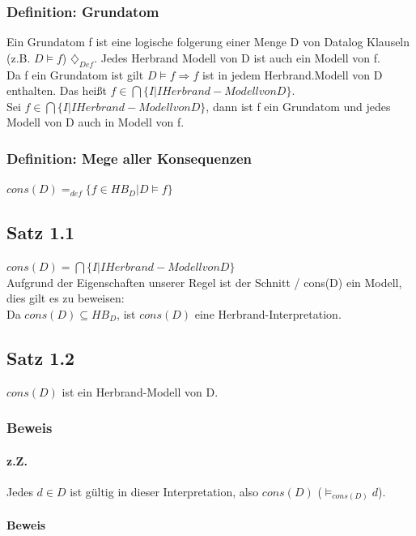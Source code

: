\documentclass[12pt, a4paper]{article}
\begin{document}
\subsubsection*{Definition: Grundatom}
Ein Grundatom f ist eine logische folgerung einer Menge D von Datalog Klauseln (z.B. $D \vDash f$) $\diamondsuit_{Def}$. Jedes Herbrand Modell von D ist auch ein Modell von f.\\
Da f ein Grundatom ist gilt $D \vDash f \Longrightarrow f $ ist in jedem Herbrand.Modell von D enthalten. Das heißt $f \in \bigcap \{ I | I Herbrand-Modell von D \}$.\\
Sei $f \in \bigcap \{ I | I Herbrand-Modell von D \}$, dann ist f ein Grundatom und jedes Modell von D auch in Modell von f. 

\subsubsection*{Definition: Mege aller Konsequenzen}

$cons(D) =_{def} \{ f \in HB_D | D \vDash f \}$


\subsection*{Satz 1.1}

$cons(D) = \bigcap \{ I | I Herbrand-Modell von D \}$ \\
Aufgrund der Eigenschaften unserer Regel ist der Schnitt / cons(D) ein Modell, dies gilt es zu beweisen: \\

Da $cons(D) \subseteq HB_D$, ist $cons(D)$ eine Herbrand-Interpretation.

\subsection*{Satz 1.2} 

$cons(D)$ ist ein Herbrand-Modell von D.

\subsubsection*{Beweis}
\paragraph*{z.Z.} 
Jedes $d \in D$ ist gültig in dieser Interpretation, also $cons(D)$ ($\vDash_{cons(D)} d$).

\paragraph*{Beweis}
\end{document}

